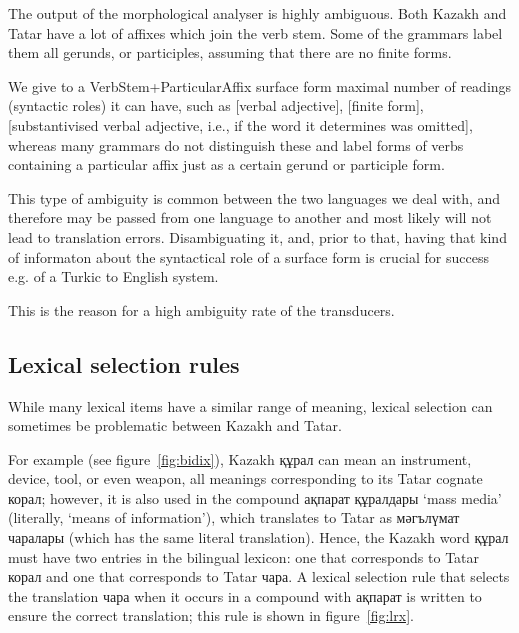 \documentclass[11pt]{article}
\newcommand{\eng}[1]{`#1'}
\begin{document}
The output of the morphological analyser is highly ambiguous. Both Kazakh and Tatar have a lot of affixes which join the
verb stem. Some of the grammars label them all gerunds, or participles, assuming that there are no finite forms.

We give to a VerbStem+ParticularAffix surface form maximal number of readings (syntactic roles) it can have, such as [verbal
adjective], [finite form], [substantivised verbal adjective, i.e., if the word it determines was omitted], whereas many grammars
do not distinguish these and label forms of verbs containing a particular affix just as a certain gerund or participle form.

This type of ambiguity is common between the two languages we deal with, and therefore may be passed from one language
to another and most likely will not lead to translation errors. Disambiguating it, and, prior to that, having that kind of
informaton about the syntactical role of a surface form is crucial for success e.g. of a Turkic to English system. 

This is the reason for a high ambiguity rate of the transducers.
  

\subsection{Lexical selection rules}

While many lexical items have a similar range of meaning, lexical selection can sometimes be problematic between Kazakh and Tatar.

For example (see figure~\ref{fig:bidix}), Kazakh құрал can mean an instrument, device, tool, or even weapon, all 
meanings corresponding to its Tatar cognate корал; however, it is also used in the 
compound ақпарат құралдары \eng{mass media} (literally, \eng{means of information}), which translates 
to Tatar as мәгълүмат чаралары (which has the same literal translation).  Hence, the Kazakh word құрал must have 
two entries in the bilingual lexicon: one that corresponds to Tatar корал and one that corresponds 
to Tatar чара.  A lexical selection rule that selects the translation чара when it occurs in a compound with ақпарат is written to ensure the correct translation; this rule is shown in figure~\ref{fig:lrx}.
\end{document}
